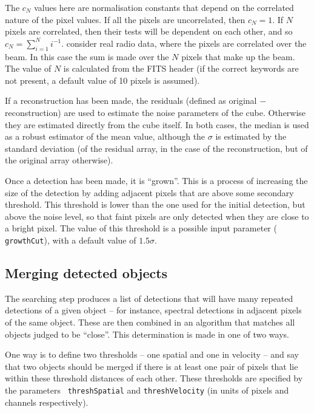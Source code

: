 \documentclass[12pt]{article}
\begin{document}
The $c_N$ values here are normalisation constants that depend on the
correlated nature of the pixel values. If all the pixels are
uncorrelated, then $c_N=1$. If $N$ pixels are correlated, then their
tests will be dependent on each other, and so $c_N = \sum_{i=1}^N
i^{-1}$. \citet{hopkins02} consider real radio data, where the pixels
are correlated over the beam. In this case the sum is made over the
$N$ pixels that make up the beam. The value of $N$ is calculated from
the FITS header (if the correct keywords are not present, a default
value of 10 pixels is assumed).

If a reconstruction has been made, the residuals (defined as original
$-$ reconstruction) are used to estimate the noise parameters of the
cube. Otherwise they are estimated directly from the cube itself. In
both cases, the median is used as a robust estimator of the mean
value, although the $\sigma$ is estimated by the standard deviation
(of the residual array, in the case of the reconstruction, but of the
original array otherwise).

Once a detection has been made, it is ``grown''. This is a process of
increasing the size of the detection by adding adjacent pixels that
are above some secondary threshold. This threshold is lower than the
one used for the initial detection, but above the noise level, so that
faint pixels are only detected when they are close to a bright
pixel. The value of this threshold is a possible input parameter ({\tt
growthCut}), with a default value of $1.5\sigma$.

\subsection{Merging detected objects}
\label{sec-merger}

The searching step produces a list of detections that will have many
repeated detections of a given object -- for instance, spectral
detections in adjacent pixels of the same object. These are then
combined in an algorithm that matches all objects judged to be
``close''. This determination is made in one of two ways.

One way is to define two thresholds -- one spatial and one in velocity
-- and say that two objects should be merged if there is at least one
pair of pixels that lie within these threshold distances of each
other. These thresholds are specified by the parameters {\tt
threshSpatial} and {\tt threshVelocity} (in units of pixels and
channels respectively).
\end{document}
